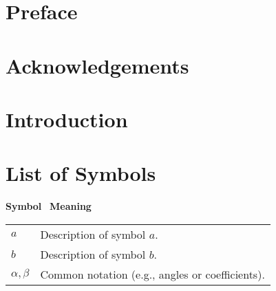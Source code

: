 \documentclass[11pt,oneside]{book} %
\begin{document}
\cleardoublepage
\thispagestyle{empty}

\cleardoublepage
\thispagestyle{empty}
\tableofcontents

\cleardoublepage
\chapter*{Preface}

\cleardoublepage
\chapter*{Acknowledgements}

\cleardoublepage
\chapter*{Introduction}

\cleardoublepage
\chapter*{List of Symbols}
\begin{center}
  \textbf{Symbol} \quad\quad\quad\ \textbf{Meaning}\\[0.2cm]
  \begin{tabular}{ll}
    $a$ & Description of symbol $a$.\\
    $b$ & Description of symbol $b$.\\
    $\alpha,\beta$ & Common notation (e.g., angles or coefficients).\\
  \end{tabular}
\end{center}

\mainmatter
\end{document}
